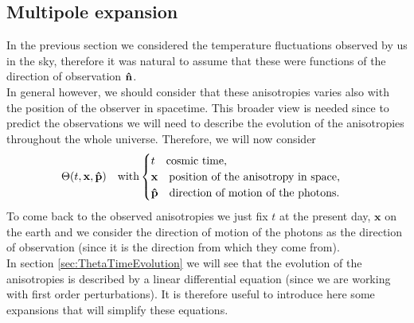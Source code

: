\subsection{Multipole expansion}\label{sec:MultipoleExpansion}
In the previous section we considered the temperature fluctuations observed by us in the sky, therefore it was natural to assume that these were functions of the direction of observation $\mathbf{\hat{n}}$.\\In general however, we should consider that these anisotropies varies also with the position of the observer in spacetime. This broader view is needed since to predict the observations we will need to describe the evolution of the anisotropies throughout the whole universe. Therefore, we will now consider
\begin{equation}
    \Theta({t,\mathbf x,\mathbf{\hat{p}}})\quad\text{with}
    \begin{cases}
        t\quad\text{cosmic time,}\\
        \mathbf x\quad\text{position of the anisotropy in space,}\\
        \mathbf{\hat{p}}\quad\text{direction of motion of the photons}.
    \end{cases}
\end{equation}
To come back to the observed anisotropies we just fix $t$ at the present day, $\mathbf x$ on the earth and we consider the direction of motion of the photons as the direction of observation (since it is the direction from which they come from).\\

In section \ref{sec:ThetaTimeEvolution} we will see that the evolution of the anisotropies is described by a linear differential equation (since we are working with first order perturbations). It is therefore useful to introduce here some expansions that will simplify these equations.

